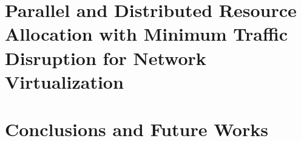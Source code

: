 \documentclass[11pt,ECE_Dissertation_Style]{report}
\newcommand\blankpage{%
    \null
    \thispagestyle{empty}%
    \addtocounter{page}{-1}%
    \newpage}
\numberwithin{algorithm}{chapter}
\begin{document}
 \chapter{Parallel and Distributed Resource Allocation with Minimum Traffic Disruption for Network Virtualization}
 \label{chap:NetworkVirtual}
 
 
 
 \chapter{Conclusions and Future Works}
 \label{chap:Future}
 
 
 


\renewcommand{\refname}{References}
\renewcommand{\bibname}{References}



\afterpage{\blankpage}
\end{document}
